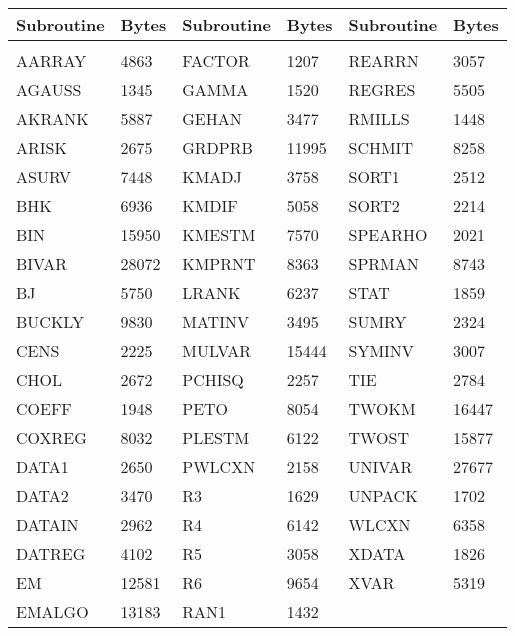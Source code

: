 \bigskip
\begin{center}
\begin{tabular}{|ll|ll|ll|} \hline
   Subroutine & Bytes & Subroutine & Bytes & Subroutine & Bytes  \\ \hline
&&&&& \\
                AARRAY &4863 & FACTOR &1207 & REARRN & 3057 \\
                AGAUSS &1345 & GAMMA &1520 & REGRES & 5505 \\
                AKRANK &5887 & GEHAN &3477 & RMILLS & 1448 \\
                ARISK &2675 & GRDPRB &11995 & SCHMIT & 8258\\
                ASURV &7448 & KMADJ &3758 & SORT1 & 2512\\
                BHK &6936 & KMDIF &5058 & SORT2 & 2214\\
                BIN &15950 & KMESTM &7570 & SPEARHO & 2021\\
                BIVAR &28072 & KMPRNT &8363 & SPRMAN & 8743\\
                BJ &5750 & LRANK &6237 & STAT & 1859\\
                BUCKLY &9830 & MATINV &3495 & SUMRY & 2324\\
                CENS &2225 & MULVAR &15444 & SYMINV & 3007\\
                CHOL &2672 & PCHISQ &2257 & TIE & 2784\\
                COEFF &1948 & PETO &8054 & TWOKM & 16447\\
                COXREG &8032 & PLESTM &6122 & TWOST & 15877\\
                DATA1 &2650 & PWLCXN &2158 & UNIVAR & 27677\\
                DATA2 &3470 & R3 &1629 & UNPACK & 1702\\
                DATAIN &2962 & R4 &6142 & WLCXN & 6358\\
                DATREG &4102 & R5 &3058 & XDATA & 1826\\
                EM &12581 & R6 &9654 & XVAR & 5319\\
                EMALGO &13183 & RAN1 &1432 & &\\ \hline
\end{tabular}
\end{center}

